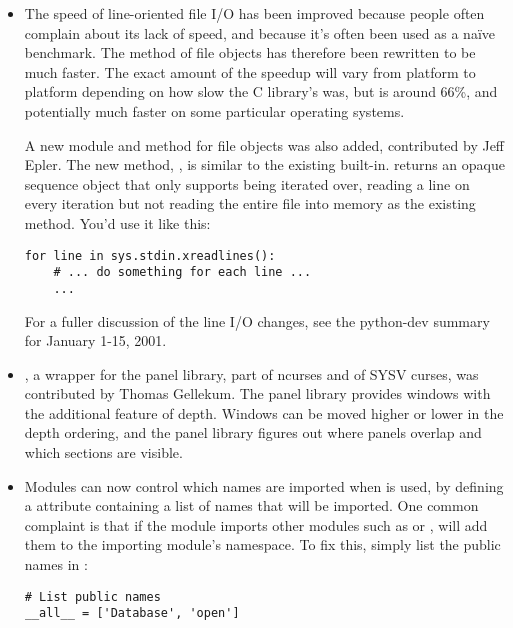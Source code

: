 \documentclass{howto}
\begin{document}
\begin{itemize}


\item The speed of line-oriented file I/O has been improved because
people often complain about its lack of speed, and because it's often
been used as a na\"ive benchmark.  The  method of
file objects has therefore been rewritten to be much faster.  The
exact amount of the speedup will vary from platform to platform
depending on how slow the C library's  was, but is
around 66\%, and potentially much faster on some particular operating
systems.

A new module and method for file objects was also added, contributed
by Jeff Epler. The new method, , is similar to
the existing  built-in.  
returns an opaque sequence object that only supports being iterated
over, reading a line on every iteration but not reading the entire file into memory as
the existing  method.  You'd use it like this:

\begin{verbatim}
for line in sys.stdin.xreadlines():
    # ... do something for each line ...
    ...
\end{verbatim}

For a fuller discussion of the line I/O changes, see the python-dev summary for January 1-15, 2001.
 
\item {}, a wrapper for the panel library, part of
ncurses and of SYSV curses, was contributed by Thomas Gellekum.  The
panel library provides windows with the additional feature of depth.
Windows can be moved higher or lower in the depth ordering, and the
panel library figures out where panels overlap and which sections are
visible.

\item Modules can now control which names are imported when  is used, by defining a  attribute
containing a list of names that will be imported.  One common
complaint is that if the module imports other modules such as
 or , 
will add them to the importing module's namespace.  To fix this,
simply list the public names in :

\begin{verbatim}
# List public names
__all__ = ['Database', 'open']
\end{verbatim}


\end{itemize}
\end{document}
